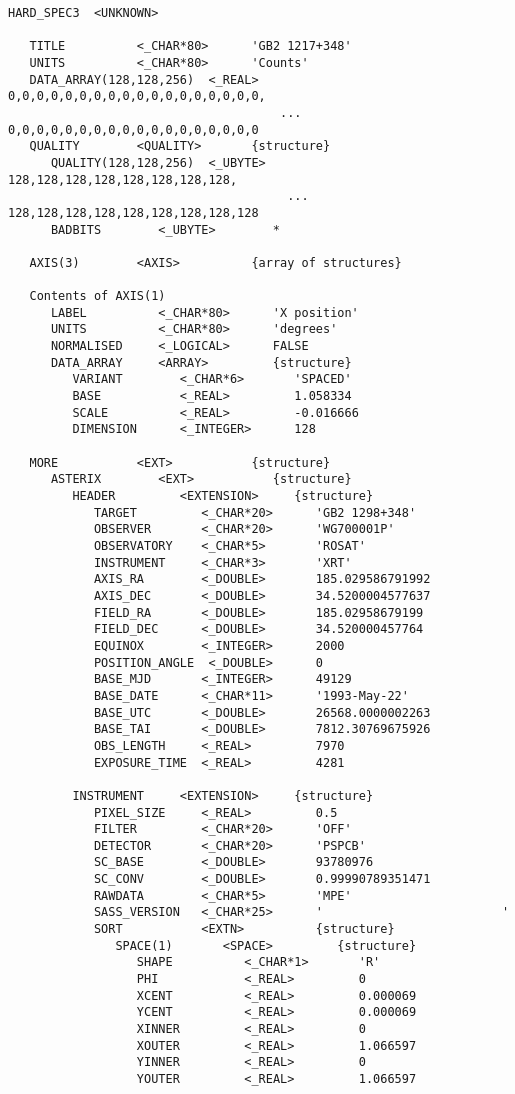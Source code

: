 \begin{verbatim}
HARD_SPEC3  <UNKNOWN>

   TITLE          <_CHAR*80>      'GB2 1217+348'
   UNITS          <_CHAR*80>      'Counts'
   DATA_ARRAY(128,128,256)  <_REAL>   0,0,0,0,0,0,0,0,0,0,0,0,0,0,0,0,0,0,
                                      ... 0,0,0,0,0,0,0,0,0,0,0,0,0,0,0,0,0,0
   QUALITY        <QUALITY>       {structure}
      QUALITY(128,128,256)  <_UBYTE>   128,128,128,128,128,128,128,128,
                                       ... 128,128,128,128,128,128,128,128,128
      BADBITS        <_UBYTE>        *

   AXIS(3)        <AXIS>          {array of structures}

   Contents of AXIS(1)
      LABEL          <_CHAR*80>      'X position'
      UNITS          <_CHAR*80>      'degrees'
      NORMALISED     <_LOGICAL>      FALSE
      DATA_ARRAY     <ARRAY>         {structure}
         VARIANT        <_CHAR*6>       'SPACED'
         BASE           <_REAL>         1.058334
         SCALE          <_REAL>         -0.016666
         DIMENSION      <_INTEGER>      128

   MORE           <EXT>           {structure}
      ASTERIX        <EXT>           {structure}
         HEADER         <EXTENSION>     {structure}
            TARGET         <_CHAR*20>      'GB2 1298+348'
            OBSERVER       <_CHAR*20>      'WG700001P'
            OBSERVATORY    <_CHAR*5>       'ROSAT'
            INSTRUMENT     <_CHAR*3>       'XRT'
            AXIS_RA        <_DOUBLE>       185.029586791992
            AXIS_DEC       <_DOUBLE>       34.5200004577637
            FIELD_RA       <_DOUBLE>       185.02958679199
            FIELD_DEC      <_DOUBLE>       34.520000457764
            EQUINOX        <_INTEGER>      2000
            POSITION_ANGLE  <_DOUBLE>      0
            BASE_MJD       <_INTEGER>      49129
            BASE_DATE      <_CHAR*11>      '1993-May-22'
            BASE_UTC       <_DOUBLE>       26568.0000002263
            BASE_TAI       <_DOUBLE>       7812.30769675926
            OBS_LENGTH     <_REAL>         7970
            EXPOSURE_TIME  <_REAL>         4281

         INSTRUMENT     <EXTENSION>     {structure}
            PIXEL_SIZE     <_REAL>         0.5
            FILTER         <_CHAR*20>      'OFF'
            DETECTOR       <_CHAR*20>      'PSPCB'
            SC_BASE        <_DOUBLE>       93780976
            SC_CONV        <_DOUBLE>       0.99990789351471
            RAWDATA        <_CHAR*5>       'MPE'
            SASS_VERSION   <_CHAR*25>      '                         '
            SORT           <EXTN>          {structure}
               SPACE(1)       <SPACE>         {structure}
                  SHAPE          <_CHAR*1>       'R'
                  PHI            <_REAL>         0
                  XCENT          <_REAL>         0.000069
                  YCENT          <_REAL>         0.000069
                  XINNER         <_REAL>         0
                  XOUTER         <_REAL>         1.066597
                  YINNER         <_REAL>         0
                  YOUTER         <_REAL>         1.066597


\end{verbatim}
